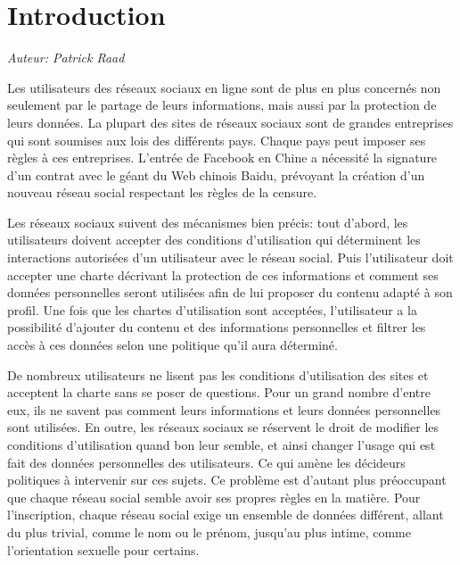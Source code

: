\section{Introduction}

\begin{flushright}\textit{Auteur: Patrick Raad}\end{flushright}

Les utilisateurs des réseaux sociaux en ligne sont de plus en plus concernés
non seulement par le partage de leurs informations, mais aussi par la
protection de leurs données. La plupart des sites de réseaux sociaux sont de
grandes entreprises qui sont soumises aux lois des différents pays. Chaque pays
peut imposer ses règles à ces entreprises. L'entrée de Facebook en Chine a
nécessité la signature d'un contrat avec le géant du Web chinois Baidu,
prévoyant la création d'un nouveau réseau social respectant les règles de la
censure. \cite{facebook-baidu}

Les réseaux sociaux suivent des mécanismes bien précis: tout d'abord, les
utilisateurs doivent accepter des conditions d'utilisation qui déterminent les
interactions autorisées d'un utilisateur avec le réseau social. Puis
l'utilisateur doit accepter une charte décrivant la protection de ces
informations et comment ses données personnelles seront utilisées afin de lui
proposer du contenu adapté à son profil. Une fois que les chartes d'utilisation
sont acceptées, l'utilisateur a la possibilité d'ajouter du contenu et des
informations personnelles et filtrer les accès à ces données selon une
politique qu'il aura déterminé.

De nombreux utilisateurs ne lisent pas les conditions d'utilisation des sites
et acceptent la charte sans se poser de questions.
\cite{facebook-privacy-issue} Pour un grand nombre d'entre eux, ils ne savent
pas comment leurs informations et leurs données personnelles sont utilisées.
\cite{facebook-user-privacy} En outre, les réseaux sociaux se réservent le
droit de modifier les conditions d'utilisation quand bon leur semble, et ainsi
changer l'usage qui est fait des données personnelles des utilisateurs. Ce qui
amène les décideurs politiques à intervenir sur ces sujets.
\cite{europe-facebook}  Ce problème est d'autant plus préoccupant que chaque
réseau social semble avoir ses propres règles en la matière. Pour
l'inscription, chaque réseau social exige un ensemble de données différent,
allant du plus trivial, comme le nom ou le prénom, jusqu'au plus intime, comme
l'orientation sexuelle pour certains.  \cite{privacy-jungle}

